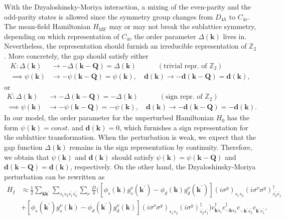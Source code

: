 \documentclass[11pt]{article}
\begin{document}
With the Dzyaloshinsky-Moriya interaction, a mixing of the even-parity and the odd-parity
states is allowed since the symmetry group changes from $D_{4h}$ to $C_{4v}$.
The mean-field Hamiltonian $H_{\mathrm{MF}}$ may or may not break the sublattice symmetry,
depending on which representation of $C_{4v}$ the order parameter $\Delta(\bm k)$ lives in. Nevertheless,
the representation should furnish an irreducible representation of $\mathbb{Z}_2$. More concretely, the gap
should satisfy either
\begin{equation}
    \begin{aligned}
    K: \Delta(\bm k) &\to -\Delta(\bm k - \bm Q) = \Delta(\bm k)
    \quad \quad \quad (\text{trivial repr. of }\mathbb{Z}_2) \\
    \implies \psi(\bm k) &\to -\psi(\bm k - \bm Q) = \psi(\bm k),\quad
    \bm d(\bm k) \to -\bm d(\bm k - \bm Q) = \bm d(\bm k),
    \end{aligned}
\end{equation}
or
\begin{equation}
    \begin{aligned}
    K: \Delta(\bm k) &\to -\Delta(\bm k - \bm Q) = -\Delta(\bm k)
    \quad \quad \quad (\text{sign repr. of }\mathbb{Z}_2) \\
    \implies \psi(\bm k) &\to -\psi(\bm k - \bm Q) = -\psi(\bm k),\quad
    \bm d(\bm k) \to -\bm d(\bm k - \bm Q) = -\bm d(\bm k).
    \end{aligned}
\end{equation}
In our model, the order parameter for the unperturbed Hamiltonian $H_0$
has the form $\psi(\bm k) = const.$ and $\bm d(\bm k) = 0$,
which furnishes a sign representation for the sublattice transformation.
When the perturbation is weak, we expect that the gap function $\Delta(\bm k)$
remains in the sign representation by continuity.
Therefore, we obtain that $\psi(\bm k)$ and $\bm d(\bm k)$ should satisfy
$\psi(\bm k) = \psi(\bm k - \bm Q)$ and $\bm d(\bm k - \bm Q) = \bm d(\bm k)$, respectively.
On the other hand, the Dzyaloshinsky-Moriya perturbation can be rewritten as
\begin{equation}
    \begin{aligned}
    H_I &\approx \frac{1}{2} \sum_{\bm k \bm k^\prime} \sum_{s_1 s_2 s_1^\prime s_2^\prime}
    \sum_{\nu} \frac{D}{4}
    \Bigg ([\phi_s(\bm k) g_s^\nu(\bm k^\prime) - \phi_d(\bm k) g_d^{\nu}(\bm k^\prime)]
    (i \sigma^y)_{s_1 s_2} (i \sigma^{\nu}\sigma^y)^\dagger_{s_2^\prime s_1^\prime}\\
        &+[\phi_s(\bm k^\prime) g_s^\nu(\bm k) - \phi_d(\bm k^\prime) g_d^{\nu}(\bm k)]
    (i \sigma^{\nu}\sigma^y)_{s_1 s_2} (i \sigma^y)^\dagger_{s_2^\prime s_1^\prime}
    \Bigg) c^\dagger_{\bm k s_1}
    c^\dagger_{-\bm k s_2} c_{-\bm k^\prime s_2^\prime} c_{\bm k^\prime s_1^\prime},
    \end{aligned}
\end{equation}
\end{document}

